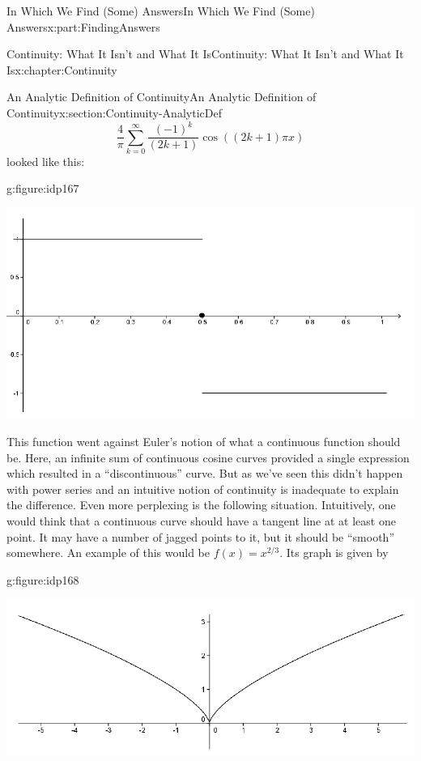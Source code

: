 \documentclass[oneside,10pt,]{book}
\numberwithin{equation}{section}
\begin{document}
\begin{partptx}{In Which We Find (Some) Answers}{}{In Which We Find (Some) Answers}{}{}{x:part:FindingAnswers}
\begin{chapterptx}{Continuity: What It Isn't and What It Is}{}{Continuity: What It Isn't and What It Is}{}{}{x:chapter:Continuity}
\begin{sectionptx}{An Analytic Definition of Continuity}{}{An Analytic Definition of Continuity}{}{}{x:section:Continuity-AnalyticDef}
\begin{equation*}
\frac{4}{\pi}\sum_{k=0}^\infty\frac{\left(-1\right)^k}{\left(2k+1\right)} \cos \left(\left(2k+1\right)\pi x\right)
\end{equation*}
looked like this:%
\begin{figureptx}{}{g:figure:idp167}{}%
\begin{image}{0.125}{0.75}{0.125}%
\includegraphics[width=\linewidth]{images/Ch5fig1.png}
\end{image}%
\tcblower
\end{figureptx}%
This function went against Euler's notion of what a continuous function should be.  Here, an infinite sum of continuous cosine curves provided a single expression which resulted in a ``discontinuous'' curve.  But as we've seen this didn't happen with power series and an intuitive notion of continuity is inadequate to explain the difference.  Even more perplexing is the following situation.  Intuitively, one would think that a continuous curve should have a tangent line at at least one point.  It may have a number of jagged points to it, but it should be ``smooth'' somewhere.  An example of this would be \(f(x)=x^{2/3}\).  Its graph is given by%
\begin{figureptx}{}{g:figure:idp168}{}%
\begin{image}{0.125}{0.75}{0.125}%
\includegraphics[width=\linewidth]{images/Ch5fig2.png}
\end{image}%

\end{figureptx}
\end{sectionptx}
\end{chapterptx}
\end{partptx}
\end{document}

